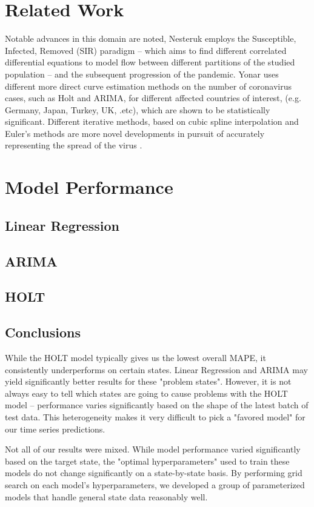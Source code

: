 \documentclass[sigconf,nonacm]{acmart}
\begin{document}
\section{Related Work}
Notable advances in this domain are noted, Nesteruk \cite{Nesteruk} employs the Susceptible, Infected, Removed (SIR) paradigm
– which aims to find different correlated differential equations to model flow between different partitions of the 
studied population – and the subsequent progression of the pandemic. Yonar \cite{EJMO} uses different more direct curve estimation methods
on the number of coronavirus cases, such as Holt and ARIMA, for different affected countries of interest, (e.g. Germany, Japan, Turkey, UK, .etc),
which are shown to be statistically significant. Different iterative methods, based on cubic spline interpolation and Euler's methods
are more novel developments in pursuit of accurately representing the spread of the virus \cite{APPADU2020}.

\section{Model Performance}
\subsection{Linear Regression}
\subsection{ARIMA}
\subsection{HOLT}
\subsection{Conclusions}

While the HOLT model typically gives us the lowest overall MAPE, it
consistently underperforms on certain states. Linear Regression and ARIMA may
yield significantly better results for these "problem states". However, it is
not always easy to tell which states are going to cause problems with the HOLT
model -- performance varies significantly based on the shape of the latest
batch of test data. This heterogeneity makes it very difficult to pick a
"favored model" for our time series predictions. 

Not all of our results were mixed. While model performance varied significantly
based on the target state, the "optimal hyperparameters" used to train these
models do not change significantly on a state-by-state basis. By performing
grid search on each model's hyperparameters, we developed a group of
parameterized models that handle general state data reasonably well. 
\end{document}
